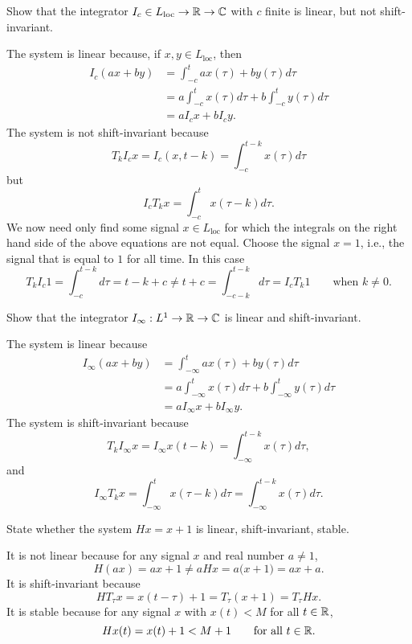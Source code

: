 \begin{excersizelist}

\item Show that the integrator $I_c \in L_{\text{loc}} \to {\mathbb R} \to {\mathbb C}$ with $c$ finite is linear, but not shift-invariant.
\begin{solution}
The system is linear because, if $x, y \in L_{\text{loc}}$, then
\begin{align*}
I_c(ax + by) &= \int_{-c}^t ax(\tau) + b y(\tau) d\tau \\
&= a\int_{-c}^t x(\tau) d\tau + b \int_{-c}^t y(\tau) d\tau \\
&= a I_c x  + b I_c y.
\end{align*}
The system is not shift-invariant because
\[
T_k I_c x = I_c(x,t-k) = \int_{-c}^{t-k} x(\tau) d\tau 
\]
but
\[
I_c T_k x = \int_{-c}^{t} x(\tau-k) d\tau.
\]
We now need only find some signal $x \in L_{\text{loc}}$ for which the integrals on the right hand side of the above equations are not equal.  Choose the signal $x = 1$, i.e., the signal that is equal to $1$ for all time.  In this case
\[
T_k I_c 1 = \int_{-c}^{t-k} d\tau =  t-k+c \neq t + c = \int_{-c-k}^{t-k} d\tau = I_c T_k 1 \qquad \text{when $k \neq 0$.}
\]
\end{solution}

\item Show that the integrator $I_\infty : L^1 \to {\mathbb R} \to {\mathbb C}$ is linear and shift-invariant.
\begin{solution}
The system is linear because
\begin{align*}
I_\infty(ax + by) &= \int_{-\infty}^t ax(\tau) + b y(\tau) d\tau \\
&= a\int_{-\infty}^t x(\tau) d\tau + b \int_{-\infty}^t y(\tau) d\tau \\
&= a I_\infty x   + b I_\infty y .
\end{align*}
The system is shift-invariant because
\[
T_k I_\infty x = I_\infty x(t-k) = \int_{-\infty}^{t-k} x(\tau) d\tau,
\]
and
\[
I_\infty T_k x = \int_{-\infty}^{t} x(\tau-k) d\tau = \int_{-\infty}^{t-k} x(\tau) d\tau.
\]
\end{solution}

\item State whether the system $H x = x + 1$ is linear, shift-invariant,  stable.
\begin{solution}
It is not linear because for any signal $x$ and real number $a \neq 1$,
\[
H(ax) = ax + 1 \neq aH x = a\big( x + 1\big) = ax + a.
\]
It is shift-invariant because
\[
H T_{\tau} x  = x(t - \tau) + 1 = T_\tau(x + 1) = T_\tau H x.
\]
It is  stable because for any signal $x$ with $x(t) < M$ for all $t\in{\mathbb R}$, 
\[
Hx(t) = x(t) + 1 < M+1 \qquad \text{for all $t \in {\mathbb R}$}. 
\]
\end{solution}


\end{excersizelist}

